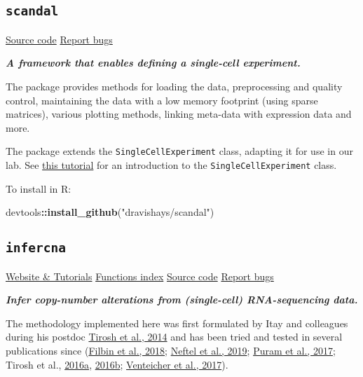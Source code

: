 \documentclass[]{book}
\newenvironment{Shaded}{\begin{snugshade}}{\end{snugshade}}
\newcommand{\KeywordTok}[1]{\textcolor[rgb]{0.13,0.29,0.53}{\textbf{#1}}}
\newcommand{\StringTok}[1]{\textcolor[rgb]{0.31,0.60,0.02}{#1}}
\newcommand{\OperatorTok}[1]{\textcolor[rgb]{0.81,0.36,0.00}{\textbf{#1}}}
\newcommand{\NormalTok}[1]{#1}
\begin{document}
\subsection{\texorpdfstring{\texttt{scandal}}{scandal}}\label{scandal}

\href{https://github.com/dravishays/scandal}{Source code} \textbar{}
\href{https://github.com/dravishays/scandal/issues}{Report bugs}

\emph{\textbf{A framework that enables defining a single-cell
experiment.}}

The package provides methods for loading the data, preprocessing and
quality control, maintaining the data with a low memory footprint (using
sparse matrices), various plotting methods, linking meta-data with
expression data and more.

The package extends the \texttt{SingleCellExperiment} class, adapting it
for use in our lab. See
\href{https://www.bioconductor.org/packages/release/bioc/vignettes/SingleCellExperiment/inst/doc/intro.html}{this
tutorial} for an introduction to the \texttt{SingleCellExperiment}
class.

To install in R:

\begin{Shaded}
\begin{Highlighting}[]
\NormalTok{devtools}\OperatorTok{::}\KeywordTok{install_github}\NormalTok{(}\StringTok{"dravishays/scandal"}\NormalTok{)}
\end{Highlighting}
\end{Shaded}

\subsection{\texorpdfstring{\texttt{infercna}}{infercna}}\label{infercna}

\href{https://jlaffy.github.io/infercna}{Website \& Tutorials}
\textbar{}
\href{https://jlaffy.github.io/infercna/reference/index.html}{Functions
index} \textbar{} \href{https://github.com/jlaffy/infercna}{Source code}
\textbar{} \href{https://github.com/jlaffy/infercna/issues}{Report bugs}

\emph{\textbf{Infer copy-number alterations from (single-cell)
RNA-sequencing data.}}

The methodology implemented here was first formulated by Itay and
colleagues during his postdoc
\href{https://science.sciencemag.org/content/344/6190/1396.long}{Tirosh
et al., 2014} and has been tried and tested in several publications
since
(\href{https://science.sciencemag.org/content/360/6386/331.long}{Filbin
et al., 2018};
\href{https://www.ncbi.nlm.nih.gov/pubmed/31327527}{Neftel et al.,
2019}; \href{https://www.ncbi.nlm.nih.gov/pubmed/29198524}{Puram et al.,
2017}; Tirosh et al.,
\href{https://science.sciencemag.org/content/352/6282/189.long}{2016a},
\href{https://www.nature.com/articles/nature20123}{2016b};
\href{https://science.sciencemag.org/content/355/6332/eaai8478.long}{Venteicher
et al., 2017}).
\end{document}
